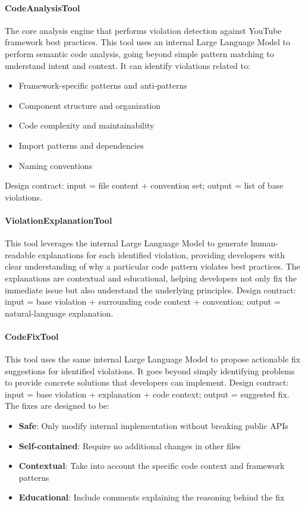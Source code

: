 \begin{spacing}{1.2}
\paragraph{CodeAnalysisTool}
The core analysis engine that performs violation detection against YouTube framework best practices. This tool uses an internal Large Language Model to perform semantic code analysis, going beyond simple pattern matching to understand intent and context. It can identify violations related to:
\begin{itemize}
    \item Framework-specific patterns and anti-patterns
    \item Component structure and organization
    \item Code complexity and maintainability
    \item Import patterns and dependencies
    \item Naming conventions
\end{itemize}
Design contract: input = file content + convention set; output = list of base violations.

\paragraph{ViolationExplanationTool}
This tool leverages the internal Large Language Model to generate human-readable explanations for each identified violation, providing developers with clear understanding of why a particular code pattern violates best practices. The explanations are contextual and educational, helping developers not only fix the immediate issue but also understand the underlying principles. Design contract: input = base violation + surrounding code context + convention; output = natural-language explanation.

\paragraph{CodeFixTool}
This tool uses the same internal Large Language Model to propose actionable fix suggestions for identified violations. It goes beyond simply identifying problems to provide concrete solutions that developers can implement. Design contract: input = base violation + explanation + code context; output = suggested fix. The fixes are designed to be:
\begin{itemize}
    \item \textbf{Safe}: Only modify internal implementation without breaking public APIs
    \item \textbf{Self-contained}: Require no additional changes in other files
    \item \textbf{Contextual}: Take into account the specific code context and framework patterns
    \item \textbf{Educational}: Include comments explaining the reasoning behind the fix
\end{itemize}


\end{spacing}
